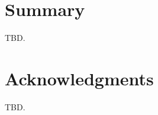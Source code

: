 % 
% 
% 
% 


\section{Summary}

TBD.


\section{Acknowledgments}

TBD.




\address{Author One\\
  Affiliation\\
  Address\\
  Country\\
  (ORCiD if desired)\\
  }

\address{Author Two\\
  Affiliation\\
  Address\\
  Country\\
  (ORCiD if desired)\\
  }

\address{Author Three\\
  Affiliation\\
  Address\\
  Country\\
  (ORCiD if desired)\\
  }
